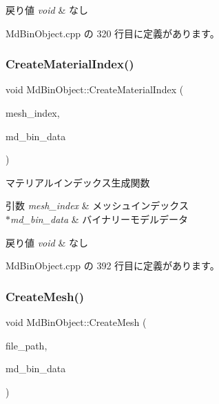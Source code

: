 \begin{DoxyRetVals}{戻り値}
{\em void} & なし \\
\hline
\end{DoxyRetVals}


 Md\+Bin\+Object.\+cpp の 320 行目に定義があります。

\mbox{\label{class_md_bin_object_a9326c21a4838e13280fd87d74b37c1d9}} 
\subsubsection{\texorpdfstring{Create\+Material\+Index()}{CreateMaterialIndex()}}
{\footnotesize\ttfamily void Md\+Bin\+Object\+::\+Create\+Material\+Index (\begin{DoxyParamCaption}\item[{int}]{mesh\+\_\+index,  }\item[{\mbox{\hyperlink{class_md_bin_data}{Md\+Bin\+Data}} $\ast$}]{md\+\_\+bin\+\_\+data }\end{DoxyParamCaption})\hspace{0.3cm}{\ttfamily [private]}}



マテリアルインデックス生成関数 


\begin{DoxyParams}{引数}
{\em mesh\+\_\+index} & メッシュインデックス \\
\hline
{\em $\ast$md\+\_\+bin\+\_\+data} & バイナリーモデルデータ \\
\hline
\end{DoxyParams}

\begin{DoxyRetVals}{戻り値}
{\em void} & なし \\
\hline
\end{DoxyRetVals}


 Md\+Bin\+Object.\+cpp の 392 行目に定義があります。

\mbox{\label{class_md_bin_object_a9a230129d19b15b7d2af7a31c68926c1}} 
\subsubsection{\texorpdfstring{Create\+Mesh()}{CreateMesh()}}
{\footnotesize\ttfamily void Md\+Bin\+Object\+::\+Create\+Mesh (\begin{DoxyParamCaption}\item[{std\+::string $\ast$}]{file\+\_\+path,  }\item[{\mbox{\hyperlink{class_md_bin_data}{Md\+Bin\+Data}} $\ast$}]{md\+\_\+bin\+\_\+data }\end{DoxyParamCaption})\hspace{0.3cm}{\ttfamily [private]}}



